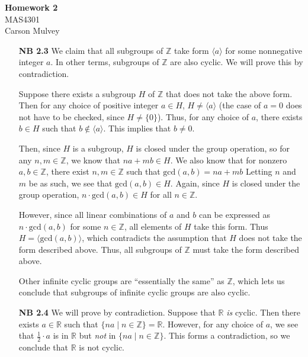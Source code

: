 \documentclass[11pt,letterpaper]{article}
\begin{document}
\begin{center}
    \begin{large}
        \textbf{Homework 2} \\
        MAS4301 \\
        Carson Mulvey
    \end{large}
\end{center}

\begin{enumerate}
\item[\textbf{NB 2.3}] We claim that all subgroups of $\mathbb{Z}$ take form $\langle a \rangle$ for some nonnegative integer $a$. In other terms, subgroups of $\mathbb{Z}$ are also cyclic. We will prove this by contradiction.

Suppose there exists a subgroup $H$ of $\mathbb{Z}$ that does not take the above form. Then for any choice of positive integer $a\in{H}$, $H \neq \langle a \rangle$ (the case of $a=0$ does not have to be checked, since $H\neq\{0\}$). Thus, for any choice of $a$, there exists $b\in{H}$ such that $b\notin{\langle a \rangle}$. This implies that $b\neq{0}$.

Then, since $H$ is a subgroup, $H$ is closed under the group operation, so for any $n,m\in{\mathbb{Z}}$, we know that $na+mb\in{H}$. We also know that for nonzero $a,b\in{\mathbb{Z}}$, there exist $n,m\in{\mathbb{Z}}$ such that $\text{gcd}(a,b)=na+mb$ Letting $n$ and $m$ be as such, we see that $\text{gcd}(a,b)\in{H}$. Again, since $H$ is closed under the group operation, $n\cdot\text{gcd}(a,b)\in{H}$ for all $n\in{\mathbb{Z}}$.

However, since all linear combinations of $a$ and $b$ can be expressed as $n\cdot\text{gcd}(a,b)$ for some $n\in{\mathbb{Z}}$, all elements of $H$ take this form. Thus $H=\langle \text{gcd}(a,b) \rangle$, which contradicts the assumption that $H$ does not take the form described above. Thus, all subgroups of $\mathbb{Z}$ must take the form described above. \qedsymbol

Other infinite cyclic groups are ``essentially the same'' as $\mathbb{Z}$, which lets us conclude that subgroups of infinite cyclic groups are also cyclic.

\item[\textbf{NB 2.4}] We will prove by contradiction. Suppose that $\mathbb{R}$ \textit{is} cyclic. Then there exists $a\in{\mathbb{R}}$ such that $\{na \mid n\in{\mathbb{Z}}\}=\mathbb{R}$. However, for any choice of $a$, we see that $\frac{1}{2}\cdot{a}$ is in $\mathbb{R}$ but \textit{not} in $\{na \mid n\in{\mathbb{Z}}\}$. This forms a contradiction, so we conclude that $\mathbb{R}$ is not cyclic. \qedsymbol


\end{enumerate}
\end{document}
